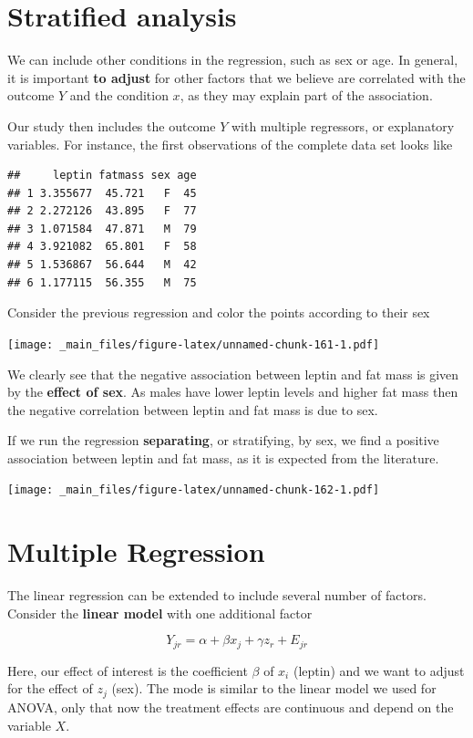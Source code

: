 \documentclass[
]{book}
\begin{document}
\hypertarget{stratified-analysis}{%
\section{Stratified analysis}\label{stratified-analysis}}

We can include other conditions in the regression, such as sex or age. In general, it is important \textbf{to adjust} for other factors that we believe are correlated with the outcome \(Y\) and the condition \(x\), as they may explain part of the association.

Our study then includes the outcome \(Y\) with multiple regressors, or explanatory variables. For instance, the first observations of the complete data set looks like

\begin{verbatim}
##     leptin fatmass sex age
## 1 3.355677  45.721   F  45
## 2 2.272126  43.895   F  77
## 3 1.071584  47.871   M  79
## 4 3.921082  65.801   F  58
## 5 1.536867  56.644   M  42
## 6 1.177115  56.355   M  75
\end{verbatim}

Consider the previous regression and color the points according to their sex

\texttt{[image: \_main\_files/figure-latex/unnamed-chunk-161-1.pdf]}

We clearly see that the negative association between leptin and fat mass is given by the \textbf{effect of sex}. As males have lower leptin levels and higher fat mass then the negative correlation between leptin and fat mass is due to sex.

If we run the regression \textbf{separating}, or stratifying, by sex, we find a positive association between leptin and fat mass, as it is expected from the literature.

\texttt{[image: \_main\_files/figure-latex/unnamed-chunk-162-1.pdf]}

\hypertarget{multiple-regression}{%
\section{Multiple Regression}\label{multiple-regression}}

The linear regression can be extended to include several number of factors. Consider the \textbf{linear model} with one additional factor

\[Y_{jr} = \alpha + \beta x_j +\gamma z_{r}+E_{jr}\]

Here, our effect of interest is the coefficient \(\beta\) of \(x_i\) (leptin) and we want to adjust for the effect of \(z_j\) (sex). The mode is similar to the linear model we used for ANOVA, only that now the treatment effects are continuous and depend on the variable \(X\).
\end{document}
